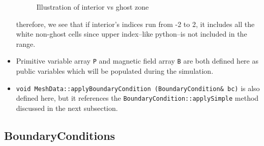 \documentclass{article}
\begin{document}
\begin{itemize}
\begin{figure}[H]
		\caption{Illustration of interior vs ghost zone}
	\end{figure}	
therefore, we see that if interior's indices run from -2 to 2, it includes all the white non-ghost cells since upper index--like python--is not included in the range.
	\item Primitive variable array \texttt{P} and magnetic field array \texttt{B} are both defined here as public variables which will be populated during the simulation.
	\item \texttt{void MeshData::applyBoundaryCondition (BoundaryCondition\& bc)} is also defined here, but it references the \texttt{BoundaryCondition::applySimple} method discussed in the next subsection.

\end{itemize}


\subsection{BoundaryConditions}
\end{document}
